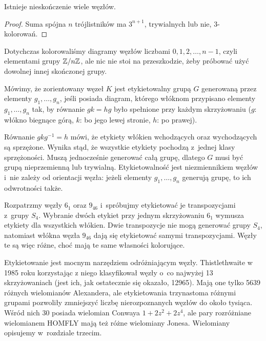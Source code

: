 \begin{corollary}
    Istnieje nieskończenie wiele węzłów.
\end{corollary}

\begin{proof}
    Suma spójna $n$ trójlistników ma $3^{n+1}$, trywialnych lub nie, $3$-kolorowań.
\end{proof}

Dotychczas kolorowaliśmy diagramy węzłów liczbami $0, 1, 2, \ldots, n-1$, czyli elementami grupy $\mathbb Z/n\mathbb Z$, ale nic nie stoi na przeszkodzie, żeby próbować użyć dowolnej innej skończonej grupy.


\begin{definition}[etykietowanie]
    Mówimy, że zorientowany węzeł $K$ jest etykietowalny grupą $G$ generowaną przez elementy $g_1, \ldots, g_n$, jeśli posiada diagram, którego włóknom przypisano elementy $g_1, \ldots, g_n$ tak, by równanie $gk=hg$ było spełnione przy każdym skrzyżowaniu ($g$: włókno biegnące górą, $k$: bo jego lewej stronie, $h$: po prawej).
\begin{comment}
    \[
        \LargePlusCrossingLabel
    \]
\end{comment}
\end{definition}

Równanie $gkg^{-1}=h$ mówi, że etykiety włókien wchodzących oraz wychodzących są sprzężone.
Wynika stąd, że wszystkie etykiety pochodzą z~jednej klasy sprzężoności.
Muszą jednocześnie generować całą grupę, dlatego $G$ musi być grupą nieprzemienną lub trywialną.
Etykietowalność jest niezmiennikiem węzłów i~nie zależy od orientacji węzła:
jeżeli elementy $g_1, \ldots, g_n$ generują grupę, to ich odwrotności także.

Rozpatrzmy węzły $6_1$ oraz $9_{46}$ i~spróbujmy etykietować je transpozycjami z~grupy $S_4$.
Wybranie dwóch etykiet przy jednym skrzyżowaniu $6_1$ wymusza etykiety dla wszystkich włókien.
Dwie transpozycje nie mogą generować grupy $S_4$, natomiast włókna węzła $9_{46}$ dają się etykietować samymi transpozycjami.
Węzły te są więc różne, choć mają te same własności kolorujące.

Etykietowanie jest mocnym narzędziem odróżniającym węzły.
Thistlethwaite w 1985 roku korzystając z niego klasyfikował węzły o~co najwyżej 13 skrzyżowaniach (jest ich, jak ostatecznie się okazało, 12965).
Mają one tylko 5639 różnych wielomianów Alexandera, ale etykietowania trzynastoma różnymi grupami pozwoliły zmniejszyć liczbę nierozpoznanych węzłów do około tysiąca.
Wśród nich 30 posiada wielomian Conwaya $1 + 2z^2 + 2z^4$, ale pary rozróżniane wielomianem HOMFLY mają też różne wielomiany Jonesa.
Wielomiany opisujemy w~rozdziale trzecim.

